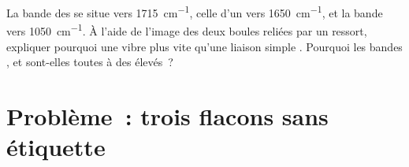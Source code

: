 \begin{exercise}[$\star\star\star$]\label{exo:g11:infrared:15}
La bande  des  se situe vers \qty{1715}{cm^{-1}}, celle
d'un  vers \qty{1650}{cm^{-1}}, et la bande  vers
\qty{1050}{cm^{-1}}. À l'aide de l'image des deux boules reliées par un
ressort, expliquer pourquoi une   vibre plus vite
qu'une liaison simple . Pourquoi les bandes , 
et  sont-elles toutes à des  élevés~?
\end{exercise}

\section{Problème~: trois flacons sans étiquette}


